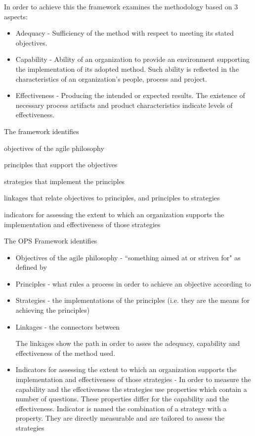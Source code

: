 In order to achieve this the framework examines the methodology based on 3 aspects:
\begin{itemize}
\item Adequacy - Sufficiency of the method with respect to meeting its stated objectives.
\item Capability - Ability of an organization to provide an environment supporting the implementation of its adopted method. Such ability is reflected in the characteristics of an organization's people, process
and project.
\item Effectiveness - Producing the intended or expected results. The existence of necessary process artifacts and product characteristics indicate levels of effectiveness.
\end{itemize}


The framework identifies 
\begin{inparaenum} [a\upshape)]
\item objectives of the agile philosophy
\item principles that support the objectives
\item strategies that implement the principles
\item linkages that relate objectives to
principles, and principles to strategies
\item indicators for assessing the extent to which an organization supports the implementation and effectiveness of those strategies
\end{inparaenum}

The OPS Framework identifies 
\begin{itemize}
\item Objectives of the agile philosophy - ``something aimed at or striven for" as defined by \citet{2604}
\item Principles - what rules a process in order to achieve an objective according to \citet{2604}
\item Strategies - the implementations of the principles (i.e. they are the means for achieving the principles)
\item Linkages - the connectors between 
The linkages show the path in order to asses the adequacy, capability and effectiveness of the method used.
\item Indicators for assessing the extent to which an organization supports the implementation and effectiveness of those strategies - In order to measure the capability and the effectiveness the strategies use properties which contain a number of questions. These properties differ for the capability and the effectiveness. Indicator is named the combination of a strategy with a property. They are directly measurable and are tailored to assess the strategies
\end{itemize}

